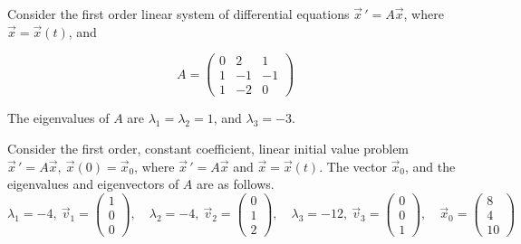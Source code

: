 \newpage 

\ifnum {}    
\question[10] Consider the first order linear system of differential equations $\vec x \, ' = A\vec x$, where $\vec x = \vec x(t)$, and 

$$A = \begin{pmatrix} 0&2&1 \\ 1&-1&-1 \\ 1&-2&0 \end{pmatrix}$$

The eigenvalues of $A$ are $\lambda_1 = \lambda_2 = 1$, and $\lambda_3 = -3$. 

\fi

\ifnum {}
\question[10] Consider the first order, constant coefficient, linear initial value problem $\vec x \, ' = A\vec x, \ \vec x (0) = \vec x_0$, where $\vec x \, ' = A\vec x$ and $\vec x = \vec x(t)$. The vector $\vec x_0$, and the eigenvalues and eigenvectors of $A$ are as follows. 
$$\lambda_1 = -4, \ \vec v_1 = \begin{pmatrix}1\\0\\0\end{pmatrix} , \quad \lambda_2 = -4, \ \vec v_2 = \begin{pmatrix} 0\\1\\2 \end{pmatrix}, \quad \lambda_3 = -12, \ \vec v_3 = \begin{pmatrix} 0\\0\\1\end{pmatrix}, \quad \vec x_0 = \begin{pmatrix} 8\\4\\10\end{pmatrix}$$
\fi


